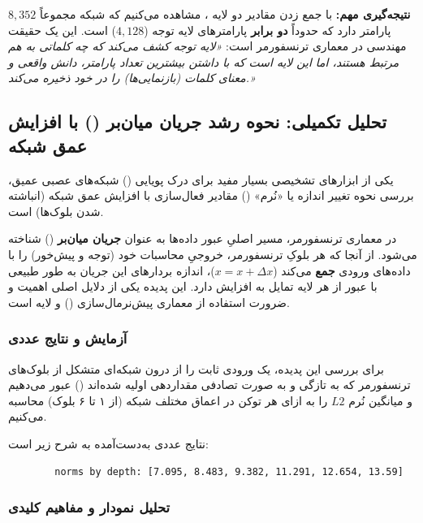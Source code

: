 \documentclass{article}
\begin{document}
\textbf{نتیجه‌گیری مهم:} با جمع زدن مقادیر دو لایه ، مشاهده می‌کنیم که شبکه  مجموعاً $8,352$ پارامتر دارد که حدوداً \textbf{دو برابر} پارامترهای لایه توجه ($4,128$) است. این یک حقیقت مهندسی در معماری ترنسفورمر است: \textit{«لایه توجه کشف می‌کند که چه کلماتی به هم مرتبط هستند، اما این لایه  است که با داشتن بیشترین تعداد پارامتر، دانش واقعی و معنای کلمات (بازنمایی‌ها) را در خود ذخیره می‌کند.»}

\subsection{تحلیل تکمیلی: نحوه رشد جریان میان‌بر () با افزایش عمق شبکه}

یکی از ابزارهای تشخیصی بسیار مفید برای درک پویایی () شبکه‌های عصبی عمیق، بررسی نحوه تغییر اندازه یا «نُرم» () مقادیر فعال‌سازی با افزایش عمق شبکه (انباشته شدن بلوک‌ها) است. 

در معماری ترنسفورمر، مسیر اصلیِ عبور داده‌ها به عنوان \textbf{جریان میان‌بر} () شناخته می‌شود. از آنجا که هر بلوکِ ترنسفورمر، خروجیِ محاسبات خود (توجه و پیش‌خور) را با داده‌های ورودی \textbf{جمع} می‌کند ($x = x + \Delta x$)، اندازه بردارهای این جریان به طور طبیعی با عبور از هر لایه تمایل به افزایش دارد. این پدیده یکی از دلایل اصلی اهمیت و ضرورت استفاده از معماری پیش‌نرمال‌سازی () و لایه  است.

\subsubsection*{آزمایش و نتایج عددی}

برای بررسی این پدیده، یک ورودی ثابت را از درون شبکه‌ای متشکل از بلوک‌های ترنسفورمر که به تازگی و به صورت تصادفی مقداردهی اولیه شده‌اند () عبور می‌دهیم و میانگین نُرم $L2$ را به ازای هر توکن در اعماق مختلف شبکه (از ۱ تا ۶ بلوک) محاسبه می‌کنیم.

نتایج عددی به‌دست‌آمده به شرح زیر است:

\begin{latin}
	\begin{lstlisting}
		norms by depth: [7.095, 8.483, 9.382, 11.291, 12.654, 13.59]
	\end{lstlisting}
\end{latin}

\subsubsection*{تحلیل نمودار و مفاهیم کلیدی}
\end{document}
